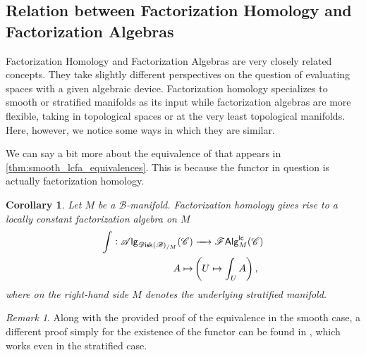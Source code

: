 \documentclass[12pt,a4paper]{article}
\newcounter{counter} \numberwithin{counter}{section}
\theoremstyle{definition}
\theoremstyle{plain}
\newtheorem{corollary}[counter]{Corollary}
\theoremstyle{remark}
\newtheorem{remark}[counter]{Remark}
\newcommand{\catC}{\mathscr{C}}
\newcommand{\lcfa}{\mathscr{F} \mathsf{Alg}^{\mathsf{lc}}}
\newcommand{\disk}{\mathscr{D} \mathsf{isk}}
\newcommand{\alg}[1]{\mathscr{A} \mathsf{lg}_{#1}}
\newcommand{\bstr}{\mathscr{B}}
\begin{document}
\subsection{Relation between Factorization Homology and Factorization Algebras}\label{ch:fh_fa_relationship}

Factorization Homology and Factorization Algebras are very closely related concepts. They take slightly different perspectives on the question of evaluating spaces with a given algebraic device. Factorization homology specializes to smooth or stratified manifolds as its input while factorization algebras are more flexible, taking in topological spaces or at the very least topological manifolds. Here, however, we notice some ways in which they are similar.

We can say a bit more about the equivalence of \cite[thm.6]{gtz2014} that appears in \cref{thm:smooth_lcfa_equivalences}. This is because the functor in question is actually factorization homology.
%
\begin{corollary}\label{cor:fh_as_an_fa}
    Let $M$ be a $\bstr$-manifold. Factorization homology gives rise to a locally constant factorization algebra on $M$
    \begin{align}
        \int : \alg{\disk(\bstr)_{/M}}(\catC) &\xrightarrow{\quad} \lcfa_M (\catC) \notag\\
        A \mapsto& \left( U \mapsto \int_U A \right),
    \end{align}
    where on the right-hand side $M$ denotes the underlying stratified manifold.
\end{corollary}

\begin{remark}
    Along with the provided proof of the equivalence \cite[thm.6]{gtz2014} in the smooth case, a different proof simply for the existence of the functor can be found in \cite[prop.3.14]{af_primer}, which works even in the stratified case.
\end{remark}
\end{document}
